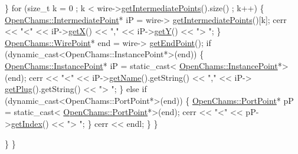 \begin{DoxyCodeInclude}
                        \}
                        \textcolor{keywordflow}{for} (\textcolor{keywordtype}{size\_t} k = 0 ; k < wire->\mbox{\hyperlink{class_open_chams_1_1_wire_aac2840e22e03db0ff2c0fe0f83c56fdd}{getIntermediatePoints}}().size() ;
       k++) \{
                            \mbox{\hyperlink{class_open_chams_1_1_intermediate_point}{OpenChams::IntermediatePoint}}* iP = wire->
      \mbox{\hyperlink{class_open_chams_1_1_wire_aac2840e22e03db0ff2c0fe0f83c56fdd}{getIntermediatePoints}}()[k];
                            cerr << \textcolor{stringliteral}{"<"} << iP->\mbox{\hyperlink{class_open_chams_1_1_intermediate_point_a2b69e4312b7814c6efce42f851893409}{getX}}() << \textcolor{stringliteral}{","} << iP->\mbox{\hyperlink{class_open_chams_1_1_intermediate_point_a15f19cf52955c8c3406831b288681358}{getY}}() << \textcolor{stringliteral}{"> "};
                        \}
                        \mbox{\hyperlink{class_open_chams_1_1_wire_point}{OpenChams::WirePoint}}* end = wire->
      \mbox{\hyperlink{class_open_chams_1_1_wire_ab1c91025a4117cede119f53d9eb8093b}{getEndPoint}}();
                        \textcolor{keywordflow}{if} (dynamic\_cast<OpenChams::InstancePoint*>(end)) \{
                            \mbox{\hyperlink{class_open_chams_1_1_instance_point}{OpenChams::InstancePoint}}* iP = \textcolor{keyword}{static\_cast<}
      \mbox{\hyperlink{class_open_chams_1_1_instance_point}{OpenChams::InstancePoint}}*\textcolor{keyword}{>}(end);
                            cerr << \textcolor{stringliteral}{"<"} << iP->\mbox{\hyperlink{class_open_chams_1_1_instance_point_a2858c0c4e8b5108f041237cf5a802029}{getName}}().getString() << \textcolor{stringliteral}{","} << iP->
      \mbox{\hyperlink{class_open_chams_1_1_instance_point_a646d464666fc56ab2e04a6b87fdd3279}{getPlug}}().getString() << \textcolor{stringliteral}{"> "};
                        \} \textcolor{keywordflow}{else} \textcolor{keywordflow}{if} (dynamic\_cast<OpenChams::PortPoint*>(end)) \{
                            \mbox{\hyperlink{class_open_chams_1_1_port_point}{OpenChams::PortPoint}}* pP = \textcolor{keyword}{static\_cast<}
      \mbox{\hyperlink{class_open_chams_1_1_port_point}{OpenChams::PortPoint}}*\textcolor{keyword}{>}(end);
                            cerr << \textcolor{stringliteral}{"<"} << pP->\mbox{\hyperlink{class_open_chams_1_1_port_point_ab4018980dcd1fed5208e7a72846cd815}{getIndex}}() << \textcolor{stringliteral}{"> "};
                        \}
                        cerr << endl;
                    \}
                \}

            \}
        \}


\end{DoxyCodeInclude}
